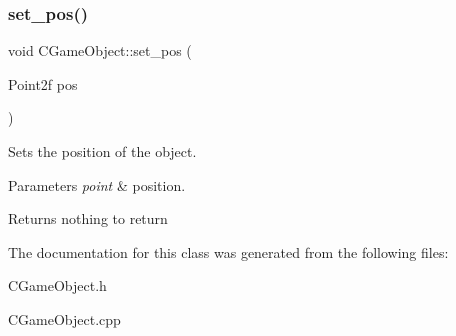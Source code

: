 \subsubsection{\texorpdfstring{set\+\_\+pos()}{set\_pos()}}
{\footnotesize\ttfamily void C\+Game\+Object\+::set\+\_\+pos (\begin{DoxyParamCaption}\item[{Point2f}]{pos }\end{DoxyParamCaption})\hspace{0.3cm}{\ttfamily [inline]}}



Sets the position of the object. 


\begin{DoxyParams}{Parameters}
{\em point} & position. \\
\hline
\end{DoxyParams}
\begin{DoxyReturn}{Returns}
nothing to return 
\end{DoxyReturn}


The documentation for this class was generated from the following files\+:\begin{DoxyCompactItemize}
\item 
C\+Game\+Object.\+h\item 
C\+Game\+Object.\+cpp\end{DoxyCompactItemize}
